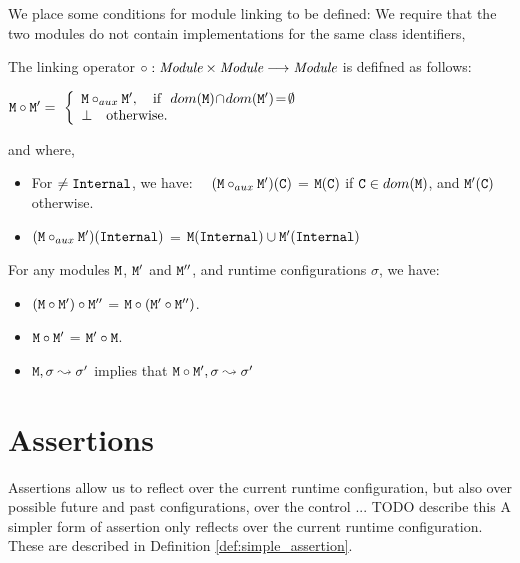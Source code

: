 We place some conditions for module linking to be defined: We require that the two modules do not contain implementations for the same class identifiers,  

\begin{definition}

The linking operator $\circ : {\mbox{\tt{{\it Module}}}} \times  {\mbox{\tt{{\it Module}}}} \longrightarrow {\mbox{\tt{{\it Module}}}}$ is defifned as follows:

$
\M \circ \M{'}  =\ \left\{
\begin{array}{l}
                        \M \circ_{aux} \M{'},\ \ \   \hbox{if}\  \ dom(\M)\!\cap\!dom(\M')\!=\!\emptyset\\
\bot  \ \ \ \mbox{otherwise.}
\end{array}
                    \right.$
                    
and where,                  
\begin{itemize}
     \item 
   For $\neq{\mbox{\tt{Internal}}}$, we have: \ \
   $({\mbox{\tt{M}}} \circ_{aux} {\mbox{\tt{M}}}')({\mbox{\tt{C}}})$ = ${\mbox{\tt{M}}}({\mbox{\tt{C}}})$  if  ${\mbox{\tt{C}}}\in dom({\mbox{\tt{M}}})$, and  ${\mbox{\tt{M}}}'({\mbox{\tt{C}}})$ otherwise.
    \item  
   $({\mbox{\tt{M}}} \circ_{aux} {\mbox{\tt{M}}}')({\mbox{\tt{Internal}}})$ = $ {\mbox{\tt{M}}}({\mbox{\tt{Internal}}}) \cup  {\mbox{\tt{M}}}'({\mbox{\tt{Internal}}})$
 \end{itemize}
\end{definition}

 
 \begin{lemma}
 For any modules ${\mbox{\tt{M}}}$,   ${\mbox{\tt{M}}}'$ and ${\mbox{\tt{M}}}''$, and runtime configurations $\sigma$, we have$:$
 \label{lemma:linking:properties}
 
 \begin{itemize}
     \item 
     $({\mbox{\tt{M}}} \circ {\mbox{\tt{M}}}')\circ {\mbox{\tt{M}}}''$ = ${\mbox{\tt{M}}} \circ ({\mbox{\tt{M}}}' \circ {\mbox{\tt{M}}}'')$.
    \item  
      ${\mbox{\tt{M}}} \circ {\mbox{\tt{M}}}'$  = ${\mbox{\tt{M}}}' \circ{\mbox{\tt{M}}}$.
      \item
      ${\mbox{\tt{M}}}, \sigma \leadsto \sigma'$  implies that  ${\mbox{\tt{M}}}\circ {\mbox{\tt{M}}}', \sigma \leadsto \sigma'$
   \end{itemize}
 
 \end{lemma}
 
\section{ Assertions}

Assertions allow us to reflect over the current runtime configuration, but also over possible future and past configurations, over 
the control ... TODO describe this
A simpler form of assertion only reflects over the current runtime configuration. These are described in Definition \ref{def:simple_assertion}.
 
